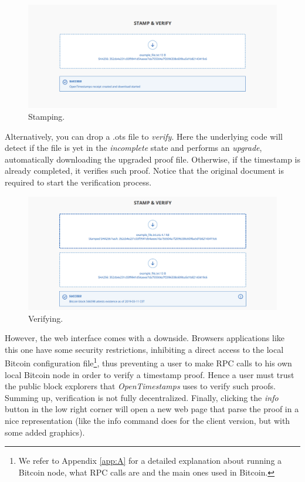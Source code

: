 \bigskip
\begin{figure}[htbp]
    \centering
	\includegraphics[width=1\linewidth]{Images/stamping.png}
	\caption{Stamping.}
	\label{fig:ots-stamping}
\end{figure}

\newpage
\noindent
Alternatively, you can drop a \colorbox{light-gray}{.ots} file to \textit{verify}. Here the underlying code will detect if the file is yet in the \textit{incomplete} state and performs an \textit{upgrade}, automatically downloading the upgraded proof file. Otherwise, if the timestamp is already completed, it verifies such proof. Notice that the original document is required to start the verification process.

\bigskip
\begin{figure}[htbp]
    \centering
	\includegraphics[width=1\linewidth]{Images/verify.png}
	\caption{Verifying.}
	\label{fig:ots-verifying}
\end{figure}

\bigskip
\noindent
However, the web interface comes with a downside. Browsers applications like this one have some security restrictions, inhibiting a direct access to the local Bitcoin configuration file\footnote{We refer to Appendix \ref{app:A} for a detailed explanation about running a Bitcoin node, what RPC calls are and the main ones used in Bitcoin.}, thus preventing a user to make RPC calls to his own local Bitcoin node in order to verify a timestamp proof. Hence a user must trust the public block explorers that \textit{OpenTimestamps} uses to verify such proofs. Summing up, verification is not fully decentralized. Finally, clicking the \textit{info} button in the low right corner will open a new web page that parse the proof in a nice representation (like the \colorbox{light-gray}{info} command does for the client version, but with some added graphics).






